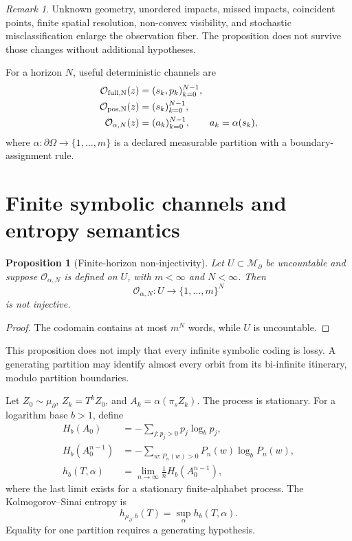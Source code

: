 \documentclass[11pt,a4paper]{article}
\theoremstyle{definition}
\theoremstyle{plain}
\newtheorem{proposition}[definition]{Proposition}
\theoremstyle{remark}
\newtheorem{remark}[definition]{Remark}
\newcommand{\Ocal}{\mathcal O}
\newcommand{\Mcal}{\mathcal M}
\begin{document}
\begin{remark}
Unknown geometry, unordered impacts, missed impacts, coincident
points, finite spatial resolution, non-convex visibility, and
stochastic misclassification enlarge the observation fiber. The
proposition does not survive those changes without additional
hypotheses.
\end{remark}

For a horizon \(N\), useful deterministic channels are
\begin{align}
\Ocal_{\rm full,N}(z)&=(s_k,p_k)_{k=0}^{N-1},\label{eq:full-channel}\\
\Ocal_{\rm pos,N}(z)&=(s_k)_{k=0}^{N-1},\label{eq:position-channel}\\
\Ocal_{\alpha,N}(z)&=(a_k)_{k=0}^{N-1},
\qquad a_k=\alpha(s_k),\label{eq:symbol-channel}
\end{align}
where \(\alpha:\partial\Omega\to\{1,\ldots,m\}\) is a declared
measurable partition with a boundary-assignment rule.

\section{Finite symbolic channels and entropy semantics}

\begin{proposition}[Finite-horizon non-injectivity]
\label{prop:finite-symbol}
Let \(U\subset\Mcal_\partial\) be uncountable and suppose
\(\Ocal_{\alpha,N}\) is defined on \(U\), with \(m<\infty\) and
\(N<\infty\). Then
\[
\Ocal_{\alpha,N}:U\to\{1,\ldots,m\}^N
\]
is not injective.
\end{proposition}

\begin{proof}
The codomain contains at most \(m^N\) words, while \(U\) is
uncountable.
\end{proof}

This proposition does not imply that every infinite symbolic coding
is lossy. A generating partition may identify almost every orbit from
its bi-infinite itinerary, modulo partition boundaries.

Let \(Z_0\sim\mu_\partial\), \(Z_k=T^kZ_0\), and
\(A_k=\alpha(\pi_s Z_k)\). The process is stationary. For a logarithm
base \(b>1\), define
\begin{align}
H_b(A_0)
&=-\sum_{j:p_j>0}p_j\log_b p_j,\label{eq:marginal-entropy}\\
H_b(A_0^{n-1})
&=-\sum_{w:P_n(w)>0}P_n(w)\log_bP_n(w),\label{eq:block-entropy}\\
h_b(T,\alpha)
&=\lim_{n\to\infty}\frac1n H_b(A_0^{n-1}),\label{eq:entropy-rate}
\end{align}
where the last limit exists for a stationary finite-alphabet process.
The Kolmogorov--Sinai entropy is
\[
h_{\mu_\partial,b}(T)=\sup_\alpha h_b(T,\alpha).
\]
Equality for one partition requires a generating hypothesis.
\end{document}
